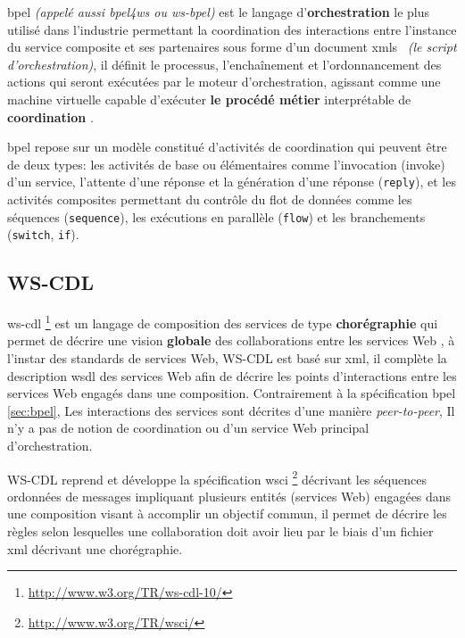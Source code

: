   \acrshort{bpel} \textit{(appelé aussi \acrshort{bpel4ws} ou
    \acrshort{ws-bpel})} est le langage d'\textbf{orchestration} le
  plus utilisé dans l'industrie permettant la coordination des
  interactions entre l'instance du service composite et ses
  partenaires sous forme d'un document
  \acrshort{xmls}~\cite{fallside2004xml} \textit{(le script
    d'orchestration)}, il définit le processus, l'enchaînement et
  l'ordonnancement des actions qui seront exécutées par le moteur
  d'orchestration, agissant comme une machine virtuelle capable
  d'exécuter \textbf{le procédé métier} interprétable de
  \textbf{coordination} \cite{chollet2009orchestration}.\medskip

  \acrshort{bpel} repose sur un modèle constitué d'activités de
  coordination qui peuvent être de deux types: les activités de base
  ou élémentaires comme l'invocation (invoke) d'un service, l'attente
  d'une réponse et la génération d'une réponse (\verb|reply|), et les
  activités composites permettant du contrôle du flot de données comme
  les séquences (\verb|sequence|), les exécutions en parallèle
  (\verb|flow|) et les branchements (\verb|switch|, \verb|if|).

  \subsection{WS-CDL}
  \label{sec:WS-CDL}
  \acrshort{ws-cdl} \footnote{\url{http://www.w3.org/TR/ws-cdl-10/}}
  \cite{kavantzas2005web} est un langage de composition des services
  de type \textbf{chorégraphie} qui permet de décrire une vision
  \textbf{globale} des collaborations entre les services Web
  \cite{elie2010}, à l'instar des standards de services Web,
  \textsc{WS-CDL} est basé sur \acrshort{xml}, il complète la
  description \acrshort{wsdl} des services Web afin de décrire les
  points d'interactions entre les services Web engagés dans une
  composition. Contrairement à la spécification \acrshort{bpel}
  \ref{sec:bpel}, Les interactions des services sont décrites d'une
  manière \textit{peer-to-peer}, Il n'y a pas de notion de
  coordination ou d'un service Web principal d'orchestration.\medskip

  \textsc{WS-CDL} reprend et développe la spécification
  \acrshort{wsci} \footnote{\url{http://www.w3.org/TR/wsci/}}
  \cite{arkin2002web} décrivant les séquences ordonnées de messages
  impliquant plusieurs entités (services Web) engagées dans une
  composition visant à accomplir un objectif commun, il permet de
  décrire les règles selon lesquelles une collaboration doit avoir
  lieu par le biais d'un fichier \acrshort{xml} décrivant une
  chorégraphie.

